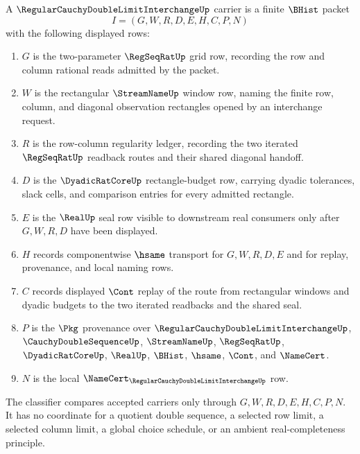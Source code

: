 \begin{definition}
\label{def:regular-cauchy-double-limit-interchange}
A $\RegularCauchyDoubleLimitInterchangeUp$ carrier is a finite $\BHist$ packet
$$
I=(G,W,R,D,E,H,C,P,N)
$$
with the following displayed rows:
\begin{enumerate}
\item $G$ is the two-parameter $\RegSeqRatUp$ grid row, recording the row and column rational reads admitted by the packet.
\item $W$ is the rectangular $\StreamNameUp$ window row, naming the finite row, column, and diagonal observation rectangles opened by an interchange request.
\item $R$ is the row-column regularity ledger, recording the two iterated $\RegSeqRatUp$ readback routes and their shared diagonal handoff.
\item $D$ is the $\DyadicRatCoreUp$ rectangle-budget row, carrying dyadic tolerances, slack cells, and comparison entries for every admitted rectangle.
\item $E$ is the $\RealUp$ seal row visible to downstream real consumers only after $G,W,R,D$ have been displayed.
\item $H$ records componentwise $\hsame$ transport for $G,W,R,D,E$ and for replay, provenance, and local naming rows.
\item $C$ records displayed $\Cont$ replay of the route from rectangular windows and dyadic budgets to the two iterated readbacks and the shared seal.
\item $P$ is the $\Pkg$ provenance over $\RegularCauchyDoubleLimitInterchangeUp$, $\CauchyDoubleSequenceUp$, $\StreamNameUp$, $\RegSeqRatUp$, $\DyadicRatCoreUp$, $\RealUp$, $\BHist$, $\hsame$, $\Cont$, and $\NameCert$.
\item $N$ is the local $\NameCert_{\RegularCauchyDoubleLimitInterchangeUp}$ row.
\end{enumerate}
The classifier compares accepted carriers only through $G,W,R,D,E,H,C,P,N$. It has no coordinate for a quotient double sequence, a selected row limit, a selected column limit, a global choice schedule, or an ambient real-completeness principle.
\end{definition}

